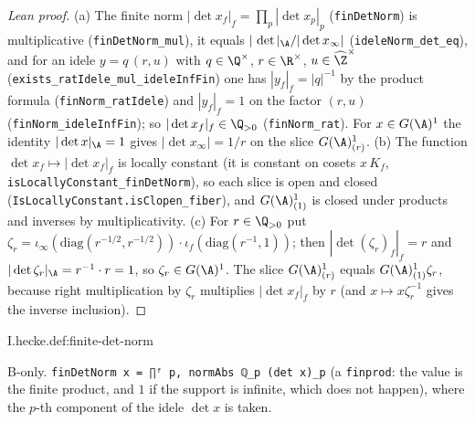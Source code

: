 \begin{proof}[Lean proof]
(a) The finite norm $|\det x_f|_f=\prod_p|\det x_p|_p$ (\texttt{finDetNorm}) is multiplicative (\texttt{finDetNorm\_mul}), it equals $|\,\det|_\A/|\det x_\infty|$ (\texttt{ideleNorm\_det\_eq}), and for an idele $y=q\,(r,u)$ with $q\in\Q^\times$, $r\in\R^\times$, $u\in\widehat\Z^\times$ (\texttt{exists\_ratIdele\_mul\_ideleInfFin}) one has $|y_f|_f=|q|^{-1}$ by the product formula (\texttt{finNorm\_ratIdele}) and $|y_f|_f=1$ on the factor $(r,u)$ (\texttt{finNorm\_ideleInfFin}); so $|\det x_f|_f\in\Q_{>0}$ (\texttt{finNorm\_rat}). For $x\in G(\A)^1$ the identity $|\det x|_\A=1$ gives $|\det x_\infty|=1/r$ on the slice $G(\A)^1_{(r)}$. (b) The function $\det x_f\mapsto|\det x_f|_f$ is locally constant (it is constant on cosets $x\,K_f$, \texttt{isLocallyConstant\_finDetNorm}), so each slice is open and closed (\texttt{IsLocallyConstant.isClopen\_fiber}), and $G(\A)^1_{(1)}$ is closed under products and inverses by multiplicativity. (c) For $r\in\Q_{>0}$ put $\zeta_r=\iota_\infty(\mathrm{diag}(r^{-1/2},r^{-1/2}))\cdot\iota_f(\mathrm{diag}(r^{-1},1))$; then $|\det(\zeta_r)_f|_f=r$ and $|\det\zeta_r|_\A=r^{-1}\cdot r=1$, so $\zeta_r\in G(\A)^1$. The slice $G(\A)^1_{(r)}$ equals $G(\A)^1_{(1)}\zeta_r$, because right multiplication by $\zeta_r$ multiplies $|\det x_f|_f$ by $r$ (and $x\mapsto x\zeta_r^{-1}$ gives the inverse inclusion).
\end{proof}

\begin{definition}
\bonly
{}
\end{definition}
\begin{tfformal}{I.hecke.def:finite-det-norm}
\begin{tffidelity}
B-only. \texttt{finDetNorm x = ∏ᶠ p, normAbs ℚ\_p (det x)\_p} (a \texttt{finprod}: the value is the finite product, and $1$ if the support is infinite, which does not happen), where the $p$-th component of the idele $\det x$ is taken.
\end{tffidelity}
\end{tfformal}


